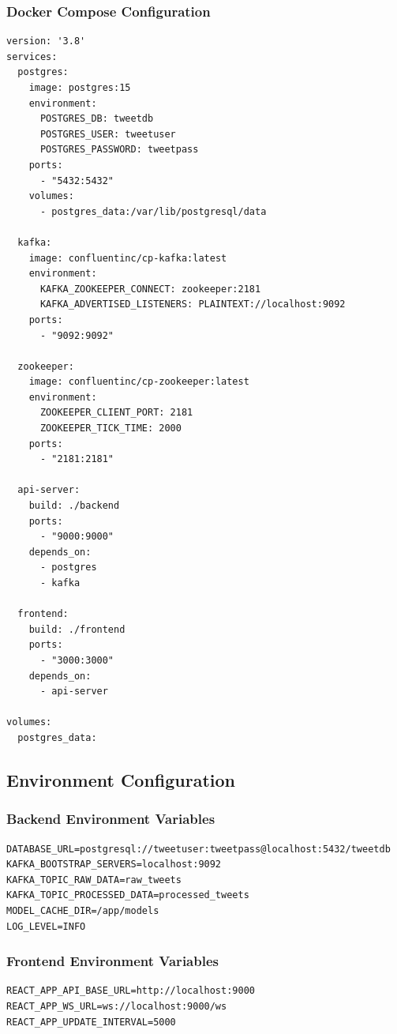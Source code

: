 \subsubsection{Docker Compose Configuration}
\begin{verbatim}
version: '3.8'
services:
  postgres:
    image: postgres:15
    environment:
      POSTGRES_DB: tweetdb
      POSTGRES_USER: tweetuser
      POSTGRES_PASSWORD: tweetpass
    ports:
      - "5432:5432"
    volumes:
      - postgres_data:/var/lib/postgresql/data

  kafka:
    image: confluentinc/cp-kafka:latest
    environment:
      KAFKA_ZOOKEEPER_CONNECT: zookeeper:2181
      KAFKA_ADVERTISED_LISTENERS: PLAINTEXT://localhost:9092
    ports:
      - "9092:9092"

  zookeeper:
    image: confluentinc/cp-zookeeper:latest
    environment:
      ZOOKEEPER_CLIENT_PORT: 2181
      ZOOKEEPER_TICK_TIME: 2000
    ports:
      - "2181:2181"

  api-server:
    build: ./backend
    ports:
      - "9000:9000"
    depends_on:
      - postgres
      - kafka

  frontend:
    build: ./frontend
    ports:
      - "3000:3000"
    depends_on:
      - api-server

volumes:
  postgres_data:
\end{verbatim}

\subsection{Environment Configuration}

\subsubsection{Backend Environment Variables}
\begin{verbatim}
DATABASE_URL=postgresql://tweetuser:tweetpass@localhost:5432/tweetdb
KAFKA_BOOTSTRAP_SERVERS=localhost:9092
KAFKA_TOPIC_RAW_DATA=raw_tweets
KAFKA_TOPIC_PROCESSED_DATA=processed_tweets
MODEL_CACHE_DIR=/app/models
LOG_LEVEL=INFO
\end{verbatim}

\subsubsection{Frontend Environment Variables}
\begin{verbatim}
REACT_APP_API_BASE_URL=http://localhost:9000
REACT_APP_WS_URL=ws://localhost:9000/ws
REACT_APP_UPDATE_INTERVAL=5000
\end{verbatim}

